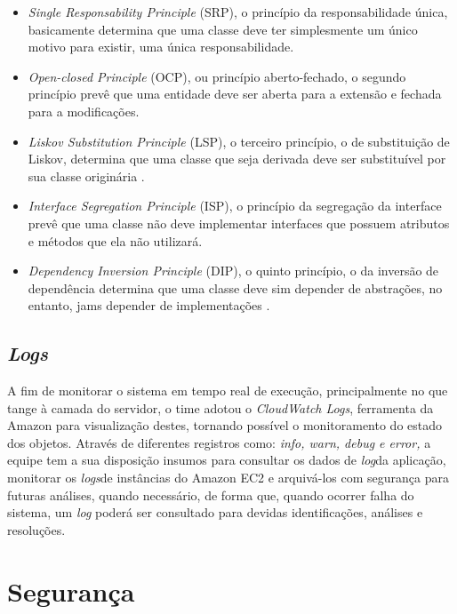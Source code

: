 \documentclass[
    12pt,               %
    openright,          %
    oneside,
    a4paper,            %
    BIBLATEX,           %
    TODO,               %
    english,            %
    brazil              %
    ]{ifsp-spo-inf-ctds}
\begin{document}
    \begin{itemize}
        \item 
        \emph{Single Responsability Principle} (SRP), o princípio da responsabilidade única, basicamente determina que uma classe deve ter simplesmente um único motivo para existir, uma única responsabilidade.
        \item 
         \emph{Open-closed Principle} (OCP), ou princípio aberto-fechado, o segundo princípio prevê que uma entidade deve ser aberta para a extensão e fechada para a modificações.
        \item 
        \emph{Liskov Substitution Principle} (LSP), o terceiro
        princípio, o de substituição de Liskov, determina que uma classe que seja derivada deve ser substituível por sua classe originária .
        \item 
        \emph{Interface Segregation Principle} (ISP), o princípio da segregação da interface prevê que uma classe não deve implementar interfaces que possuem atributos e métodos que ela não utilizará.
        \item 
        \emph{Dependency Inversion Principle} (DIP), o quinto princípio, o da inversão de dependência determina que uma classe deve sim depender de abstrações, no entanto, jams depender de implementações .
    \end{itemize}        

        \subsection{\emph{Logs}}
        A fim de monitorar o sistema em tempo real de execução, principalmente no que tange à camada do servidor, o time adotou o \emph{CloudWatch Logs}, ferramenta da Amazon para visualização destes, tornando possível o monitoramento do estado dos objetos. Através de diferentes registros como: \emph{info, warn, debug e error,} a equipe tem a sua disposição insumos para consultar os dados de \emph{log}da aplicação, monitorar os \emph{logs}de instâncias do Amazon EC2 e arquivá-los com segurança para futuras análises, quando necessário, de forma que, quando ocorrer falha do sistema, um \emph{log} poderá ser consultado para devidas identificações, análises e resoluções.


    \section{Segurança}
\end{document}
